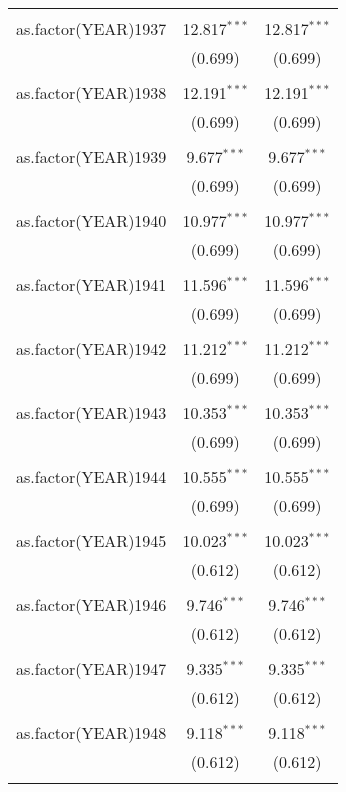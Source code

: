 \begin{table}[!htbp]
\begin{tabular}{@{\extracolsep{5pt}}lcc}
  & & \\ 
 as.factor(YEAR)1937 & 12.817$^{***}$ & 12.817$^{***}$ \\ 
  & (0.699) & (0.699) \\ 
  & & \\ 
 as.factor(YEAR)1938 & 12.191$^{***}$ & 12.191$^{***}$ \\ 
  & (0.699) & (0.699) \\ 
  & & \\ 
 as.factor(YEAR)1939 & 9.677$^{***}$ & 9.677$^{***}$ \\ 
  & (0.699) & (0.699) \\ 
  & & \\ 
 as.factor(YEAR)1940 & 10.977$^{***}$ & 10.977$^{***}$ \\ 
  & (0.699) & (0.699) \\ 
  & & \\ 
 as.factor(YEAR)1941 & 11.596$^{***}$ & 11.596$^{***}$ \\ 
  & (0.699) & (0.699) \\ 
  & & \\ 
 as.factor(YEAR)1942 & 11.212$^{***}$ & 11.212$^{***}$ \\ 
  & (0.699) & (0.699) \\ 
  & & \\ 
 as.factor(YEAR)1943 & 10.353$^{***}$ & 10.353$^{***}$ \\ 
  & (0.699) & (0.699) \\ 
  & & \\ 
 as.factor(YEAR)1944 & 10.555$^{***}$ & 10.555$^{***}$ \\ 
  & (0.699) & (0.699) \\ 
  & & \\ 
 as.factor(YEAR)1945 & 10.023$^{***}$ & 10.023$^{***}$ \\ 
  & (0.612) & (0.612) \\ 
  & & \\ 
 as.factor(YEAR)1946 & 9.746$^{***}$ & 9.746$^{***}$ \\ 
  & (0.612) & (0.612) \\ 
  & & \\ 
 as.factor(YEAR)1947 & 9.335$^{***}$ & 9.335$^{***}$ \\ 
  & (0.612) & (0.612) \\ 
  & & \\ 
 as.factor(YEAR)1948 & 9.118$^{***}$ & 9.118$^{***}$ \\ 
  & (0.612) & (0.612) \\ 
  & & \\ 

\end{tabular}
\end{table}
